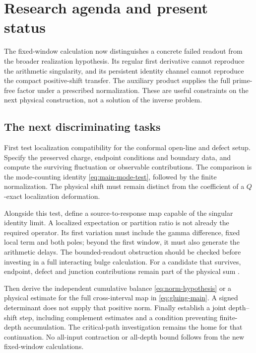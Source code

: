 \section{Research agenda and present status}\label{sec:outlook}

The fixed-window calculation now distinguishes a concrete failed
readout from the broader realization hypothesis. Its regular
first derivative cannot reproduce the arithmetic singularity, and
its persistent identity channel cannot reproduce the compact
positive-shift transfer. The auxiliary product supplies the full
prime-free factor under a prescribed normalization. These are
useful constraints on the next physical construction, not a
solution of the inverse problem.

\subsection{The next discriminating tasks}

First test localization compatibility for the conformal open-line
and defect setup. Specify the preserved charge, endpoint conditions
and boundary data, and compute the surviving fluctuation or
observable contributions. The comparison is the mode-counting
identity \eqref{eq:main-mode-test}, followed by the finite
normalization. The physical shift must remain distinct from the
coefficient of a $Q$-exact localization deformation.

Alongside this test, define a source-to-response map capable of the
singular identity limit. A localized expectation or partition ratio
is not already the required operator. Its first variation must
include the gamma difference, fixed local term and both poles;
beyond the first window, it must also generate the arithmetic
delays. The bounded-readout obstruction should be checked before
investing in a full interacting bulge calculation. For a candidate
that survives, endpoint, defect and junction contributions remain
part of the physical sum \cite[Section~S8.4]{Supplement}.

Then derive the independent cumulative balance
\eqref{eq:norm-hypothesis} or a physical estimate for the full
cross-interval map in \eqref{eq:gluing-main}. A signed determinant
does not supply that positive norm. Finally establish a joint
depth--shift step, including complement estimates and a condition
preventing finite-depth accumulation. The critical-path
investigation remains the home for that continuation. No
all-input contraction or all-depth bound follows from the new
fixed-window calculations.

